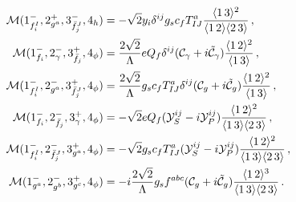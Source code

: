 \begin{align}
    \mathcal M(1^-_{f_i^I},2^+_{g^a},3^-_{\bar f_j^J},4_h) &= -\sqrt{2} y_i \delta^{ij} g_s c_f T^a_{IJ} \frac{\langle1\, 3 \rangle^2}{\langle1\, 2 \rangle\langle2\, 3 \rangle} \,,\\
    \mathcal M(1^-_{f_i},2^-_\gamma,3^+_{\bar f_j},4_\phi) &= \frac{2\sqrt 2}{\Lambda} e Q_f \delta^{ij}(\mathcal C_\gamma + i\tilde{\mathcal C}_\gamma)\frac{\langle1\, 2 \rangle^2}{\langle1\, 3 \rangle}\,,\\
    \mathcal M(1^-_{f_i^I},2^-_{g^a},3^+_{\bar f_j^J},4_\phi) &= \frac{2\sqrt 2}{\Lambda} g_s c_f T^a_{IJ} \delta^{ij}(\mathcal C_g + i\tilde{\mathcal C}_g)\frac{\langle1\, 2 \rangle^2}{\langle1\, 3 \rangle}\,,\\
    \mathcal M(1^-_{f_i},2^-_{\bar f_j},3^+_\gamma,4_\phi) &= -\sqrt 2 e Q_f (\mathcal Y_S^{ij}-i\mathcal Y_P^{ij})\frac{\langle1\, 2 \rangle^2}{\langle1\, 3 \rangle\langle2\, 3 \rangle} \,,\\
    \mathcal M(1^-_{f_i^I},2^-_{\bar f_j^J},3^+_{g^a},4_\phi) &= -\sqrt 2 g_s c_f T^a_{IJ} (\mathcal Y_S^{ij}-i\mathcal Y_P^{ij})\frac{\langle1\, 2 \rangle^2}{\langle1\, 3 \rangle\langle2\, 3 \rangle}\,,\\
    \mathcal M(1^-_{g^a},2^-_{g^b},3^+_{g^c},4_\phi) &= -i\frac{2\sqrt 2}{\Lambda}g_sf^{abc}(\mathcal C_g+i\tilde{\mathcal C}_g)\frac{\langle1\, 2 \rangle^3}{\langle1\, 3 \rangle\langle2\, 3 \rangle}\,.
\end{align}
